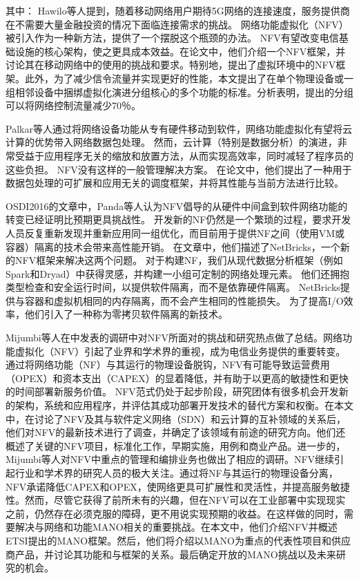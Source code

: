 其中：
Hawilo等人提到，随着移动网络用户期待5G网络的连接速度，服务提供商在不需要大量金融投资的情况下面临连接需求的挑战。 网络功能虚拟化（NFV）被引入作为一种新方法，提供了一个摆脱这个瓶颈的办法。 NFV有望改变电信基础设施的核心架构，使之更具成本效益。在论文中，他们介绍一个NFV框架，并讨论其在移动网络中的使用的挑战和要求。特别地，提出了虚拟环境中的NFV框架。此外，为了减少信令流量并实现更好的性能，本文提出了在单个物理设备或一组相邻设备中捆绑虚拟化演进分组核心的多个功能的标准。分析表明，提出的分组可以将网络控制流量减少70％。

Palkar等人通过将网络设备功能从专有硬件移动到软件，网络功能虚拟化有望将云计算的优势带入网络数据包处理。 然而，云计算（特别是数据分析）的演进，非常受益于应用程序无关的缩放和放置方法，从而实现高效率，同时减轻了程序员的这些负担。 NFV没有这样的一般管理解决方案。 在论文中，他们提出了一种用于数据包处理的可扩展和应用无关的调度框架，并将其性能与当前方法进行比较。

OSDI2016的文章中，Panda等人认为NFV倡导的从硬件中间盒到软件网络功能的转变已经证明比预期更具挑战性。 开发新的NF仍然是一个繁琐的过程，要求开发人员反复重新发现并重新应用同一组优化，而目前用于提供NF之间（使用VM或容器）隔离的技术会带来高性能开销。 在文章中，他们描述了NetBricks，一个新的NFV框架来解决这两个问题。 对于构建NF，我们从现代数据分析框架（例如Spark和Dryad）中获得灵感，并构建一小组可定制的网络处理元素。 他们还拥抱类型检查和安全运行时间，以提供软件隔离，而不是依靠硬件隔离。 NetBricks提供与容器和虚拟机相同的内存隔离，而不会产生相同的性能损失。 为了提高I/O效率，他们引入了一种称为零拷贝软件隔离的新技术。

Mijumbi等人在中发表的调研中对NFV所面对的挑战和研究热点做了总结。网络功能虚拟化（NFV）引起了业界和学术界的重视，成为电信业务提供的重要转变。通过将网络功能（NF）与其运行的物理设备脱钩，NFV有可能导致运营费用（OPEX）和资本支出（CAPEX）的显着降低，并有助于以更高的敏捷性和更快的时间部署新服务价值。 NFV范式仍处于起步阶段，研究团体有很多机会开发新的架构，系统和应用程序，并评估其成功部署开发技术的替代方案和权衡。在本文中，在讨论了NFV及其与软件定义网络（SDN）和云计算的互补领域的关系后，他们对NFV的最新技术进行了调查，并确定了该领域有前途的研究方向。他们还概述了关键的NFV项目，标准化工作，早期实施，用例和商业产品。进一步的，Mijumbi等人对NFV中重点的管理和编排业务也做出了相应的调研。NFV继续引起行业和学术界的研究人员的极大关注。通过将NF与其运行的物理设备分离，NFV承诺降低CAPEX和OPEX，使网络更具可扩展性和灵活性，并提高服务敏捷性。然而，尽管它获得了前所未有的兴趣，但在NFV可以在工业部署中实现现实之前，仍然存在必须克服的障碍，更不用说实现预期的收益。在这样做的同时，需要解决与网络和功能MANO相关的重要挑战。在本文中，他们介绍NFV并概述ETSI提出的MANO框架。然后，他们将介绍以MANO为重点的代表性项目和供应商产品，并讨论其功能和与框架的关系。最后确定开放的MANO挑战以及未来研究的机会。


